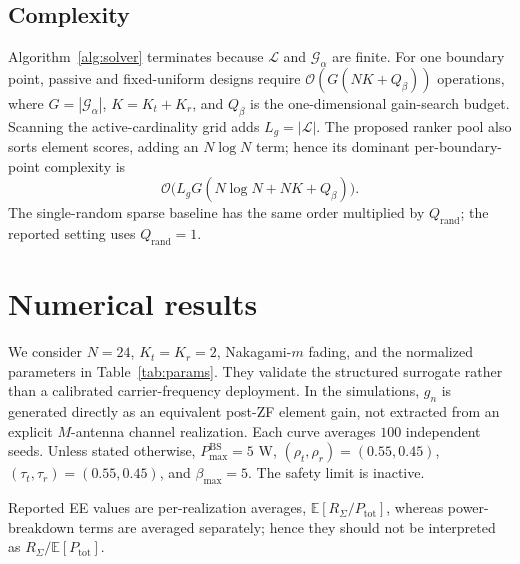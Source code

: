 \documentclass[journal]{IEEEtran}
\begin{document}
\subsection{Complexity}
Algorithm~\ref{alg:solver} terminates because $\mathcal{L}$ and $\mathcal{G}_{\alpha}$ are finite. For one boundary point, passive and fixed-uniform designs require $\mathcal{O}(G(NK+Q_{\beta}))$ operations, where $G=|\mathcal{G}_{\alpha}|$, $K=K_t+K_r$, and $Q_{\beta}$ is the one-dimensional gain-search budget. Scanning the active-cardinality grid adds $L_g=|\mathcal{L}|$. The proposed ranker pool also sorts element scores, adding an $N\log N$ term; hence its dominant per-boundary-point complexity is
\[
\mathcal{O}\bigl(L_gG(N\log N+NK+Q_{\beta})\bigr).
\]
The single-random sparse baseline has the same order multiplied by $Q_{\mathrm{rand}}$; the reported setting uses $Q_{\mathrm{rand}}=1$.

\section{Numerical results}
We consider $N=24$, $K_t=K_r=2$, Nakagami-$m$ fading, and the normalized parameters in Table~\ref{tab:params}. They validate the structured surrogate rather than a calibrated carrier-frequency deployment. In the simulations, $g_n$ is generated directly as an equivalent post-ZF element gain, not extracted from an explicit $M$-antenna channel realization. Each curve averages $100$ independent seeds. Unless stated otherwise, $P_{\max}^{\mathrm{BS}}=5$ W, $(\rho_t,\rho_r)=(0.55,0.45)$, $(\tau_t,\tau_r)=(0.55,0.45)$, and $\beta_{\max}=5$. The safety limit is inactive.

Reported EE values are per-realization averages, $\mathbb{E}[R_\Sigma/P_{\mathrm{tot}}]$, whereas power-breakdown terms are averaged separately; hence they should not be interpreted as $R_\Sigma/\mathbb{E}[P_{\mathrm{tot}}]$.
\end{document}
